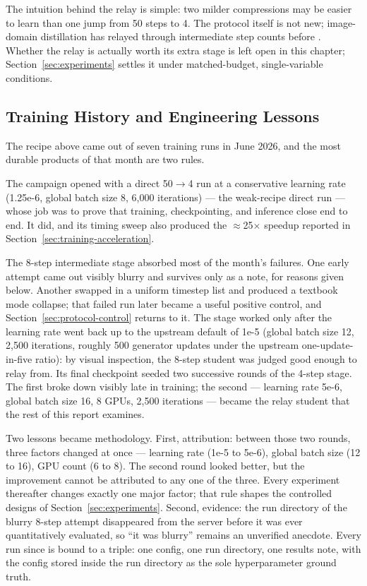 \documentclass[11pt,a4paper]{article}
\begin{document}
The intuition behind the relay is simple: two milder compressions may be easier to learn than one jump from 50 steps to 4. The protocol itself is not new; image-domain distillation has relayed through intermediate step counts before \cite{sdxllightning,hypersd}. Whether the relay is actually worth its extra stage is left open in this chapter; Section~\ref{sec:experiments} settles it under matched-budget, single-variable conditions.

\subsection{Training History and Engineering Lessons}\label{sec:training-history}

The recipe above came out of seven training runs in June 2026, and the most durable products of that month are two rules.

The campaign opened with a direct 50$\to$4 run at a conservative learning rate (1.25e-6, global batch size 8, 6,000 iterations) — the weak-recipe direct run — whose job was to prove that training, checkpointing, and inference close end to end. It did, and its timing sweep also produced the $\approx$25$\times$ speedup reported in Section~\ref{sec:training-acceleration}.

The 8-step intermediate stage absorbed most of the month's failures. One early attempt came out visibly blurry and survives only as a note, for reasons given below. Another swapped in a uniform timestep list and produced a textbook mode collapse; that failed run later became a useful positive control, and Section~\ref{sec:protocol-control} returns to it. The stage worked only after the learning rate went back up to the upstream default of 1e-5 (global batch size 12, 2,500 iterations, roughly 500 generator updates under the upstream one-update-in-five ratio): by visual inspection, the 8-step student was judged good enough to relay from. Its final checkpoint seeded two successive rounds of the 4-step stage. The first broke down visibly late in training; the second — learning rate 5e-6, global batch size 16, 8 GPUs, 2,500 iterations — became the relay student that the rest of this report examines.

Two lessons became methodology. First, attribution: between those two rounds, three factors changed at once — learning rate (1e-5 to 5e-6), global batch size (12 to 16), GPU count (6 to 8). The second round looked better, but the improvement cannot be attributed to any one of the three. Every experiment thereafter changes exactly one major factor; that rule shapes the controlled designs of Section~\ref{sec:experiments}. Second, evidence: the run directory of the blurry 8-step attempt disappeared from the server before it was ever quantitatively evaluated, so ``it was blurry'' remains an unverified anecdote. Every run since is bound to a triple: one config, one run directory, one results note, with the config stored inside the run directory as the sole hyperparameter ground truth.
\end{document}
